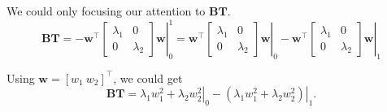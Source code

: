 \documentclass{article}
\theoremstyle{definition}
\begin{document}
    We could only focusing our attention to $\textbf{BT}$.
    \begin{equation}\label{eq:bt_correct}
        \textbf{BT} = - 
        \left.\mathbf{w}^\top
        \begin{bmatrix}
            \lambda_1 &  0 \\
            0 &  \lambda_2
       \end{bmatrix}
        \mathbf{w}\right\vert_0^1 
        =\left.\mathbf{w}^\top
        \begin{bmatrix}
            \lambda_1 &  0 \\
            0 &  \lambda_2
       \end{bmatrix}
        \mathbf{w}\right\vert_0 
        - 
        \left.\mathbf{w}^\top
        \begin{bmatrix}
            \lambda_1 &  0 \\
            0 &  \lambda_2
       \end{bmatrix}
        \mathbf{w}\right\vert_1
    \end{equation}
    
    Using $\mathbf{w} = [w_1 \ w_2]^\top$, 
    we could get 
    \begin{equation}\label{bt-terms}
        \textbf{BT} 
        = \left.\lambda_1 w_1^2 + \lambda_2 w_2^2\right\vert_0
        - \left.(\lambda_1 w_1^2 + \lambda_2 w_2^2)\right\vert_1. 
    \end{equation}
    
\end{document}
